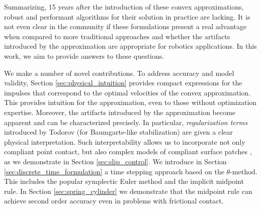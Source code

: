 Summarizing, 15 years after the introduction of these convex
approximations, robust and performant algorithms for their solution in practice
are lacking. It is not even clear in the community if these formulations present
a real advantage when compared to more traditional approaches and whether the
artifacts introduced by the approximation are appropriate for robotics
applications. In this work, we aim to provide answers to these questions. 

We make a number of novel contributions. To address accuracy and model validity,
Section \ref{sec:physical_intuition} provides compact expressions for the
impulses that correspond to the optimal velocities of the convex approximation.
This provides intuition for the approximation, even to those without
optimization expertise. Moreover, the artifacts introduced by the approximation
become apparent and can be characterized precisely. In particular,
\emph{regularization terms} introduced by Todorov \cite{bib:todorov2014} (for
Baumgarte-like stabilization) are given a clear physical interpretation. Such
interpretability  allows us to incorporate not only compliant point contact, but
also complex models of compliant surface patches \cite{bib:elandt2019pressure},
as we demonstrate in Section \ref{sec:slip_control}. We introduce in Section
\ref{sec:discrete_time_formulation} a time stepping approach based on the
$\theta\text{-method}$. This includes the popular symplectic Euler method and
the implicit midpoint rule. In Section \ref{sec:spring_cylinder} we demonstrate
that the midpoint rule can achieve second order accuracy even in problems with
frictional contact.

